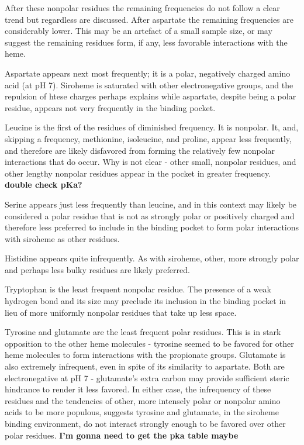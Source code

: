 \documentclass[a4paper, nobind]{templates/ociamthesis}
\begin{document}
After these nonpolar residues the remaining frequencies do not follow a clear trend but regardless are discussed. After aspartate the remaining frequencies are considerably lower. This may be an artefact of a small sample size, or may suggest the remaining residues form, if any, less favorable interactions with the heme.

Aspartate appears next most frequently; it is a polar, negatively charged amino acid (at pH 7). Siroheme is saturated with other electronegative groups, and the repulsion of htese charges perhaps explains while aspartate, despite being a polar residue, appears not very frequently in the binding pocket.

Leucine is the first of the residues of diminished frequency. It is nonpolar. It, and, skipping a frequency, methionine, isoleucine, and proline, appear less frequently, and therefore are likely disfavored from forming the relatively few nonpolar interactions that do occur. Why is not clear - other small, nonpolar residues, and other lengthy nonpolar residues appear in the pocket in greater frequency. \textbf{double check pKa?}

Serine appears just less frequently than leucine, and in this context may likely be considered a polar residue that is not as strongly polar or positively charged and therefore less preferred to include in the binding pocket to form polar interactions with siroheme as other residues.

Histidine appears quite infrequently. As with siroheme, other, more strongly polar and perhaps less bulky residues are likely preferred.

Tryptophan is the least frequent nonpolar residue. The presence of a weak hydrogen bond and its size may preclude its inclusion in the binding pocket in lieu of more uniformly nonpolar residues that take up less space.

Tyrosine and glutamate are the least frequent polar residues. This is in stark opposition to the other heme molecules - tyrosine seemed to be favored for other heme molecules to form interactions with the propionate groups. Glutamate is also extremely infrequent, even in spite of its similarity to aspartate. Both are electronegative at pH 7 - glutamate's extra carbon may provide sufficient steric hindrance to render it less favored. In either case, the infrequency of these residues and the tendencies of other, more intensely polar or nonpolar amino acids to be more populous, suggests tyrosine and glutamate, in the siroheme binding environment, do not interact strongly enough to be favored over other polar residues. \textbf{I'm gonna need to get the pka table maybe}
\end{document}
